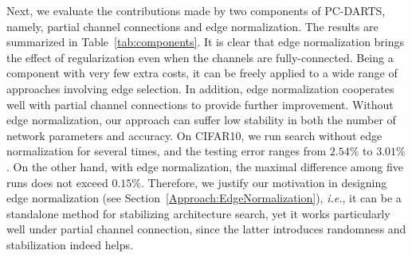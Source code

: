 \documentclass{article} \usepackage{iclr2020_conference,times}
\begin{document}
Next, we evaluate the contributions made by two components of PC-DARTS, namely, partial channel connections and edge normalization. The results are summarized in Table~\ref{tab:components}. It is clear that edge normalization brings the effect of regularization even when the channels are fully-connected. Being a component with very few extra costs, it can be freely applied to a wide range of approaches involving edge selection. In addition, edge normalization cooperates well with partial channel connections to provide further improvement. Without edge normalization, our approach can suffer low stability in both the number of network parameters and accuracy. On CIFAR10, we run search without edge normalization for several times, and the testing error ranges from $2.54\%$ to $3.01\%$. On the other hand, with edge normalization, the maximal difference among five runs does not exceed $0.15\%$. Therefore, we justify our motivation in designing edge normalization (see Section~\ref{Approach:EdgeNormalization}), \textit{i.e.}, it can be a standalone method for stabilizing architecture search, yet it works particularly well under partial channel connection, since the latter introduces randomness and stabilization indeed helps.



\begin{table}[!t]
\centering
\small
\caption{Experiments on stability of DARTS and PC-DARTS. Left: Evaluations of searched architectures in five independent search runs. Middle: architectures searched with different numbers of epochs. Right: runs on architectures searched with different numbers of nodes.}
\label{table:stability}
\begin{threeparttable}[b]
\end{threeparttable}
\end{table}
\end{document}
